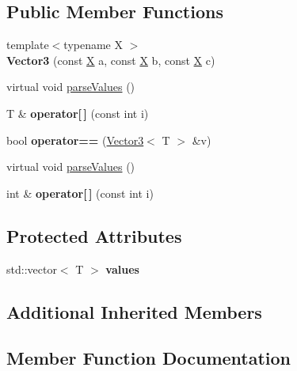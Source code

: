 \subsection*{Public Member Functions}
\begin{DoxyCompactItemize}
\item 
\mbox{\label{classVector3_a4f08341de72b29b98df76f81eaf6d4f0}} 
{\footnotesize template$<$typename X $>$ }\\{\bfseries Vector3} (const \hyperlink{classX}{X} a, const \hyperlink{classX}{X} b, const \hyperlink{classX}{X} c)
\item 
virtual void \hyperlink{classVector3_a15a1271a3ba4497ca95cc4dd66481f9e}{parse\+Values} ()
\item 
\mbox{\label{classVector3_a9833b43da58a55b3d466c576be10bad5}} 
T \& {\bfseries operator\mbox{[}$\,$\mbox{]}} (const int i)
\item 
\mbox{\label{classVector3_a2a17ca1fc283c97c240b5fabcf1de375}} 
bool {\bfseries operator==} (\hyperlink{classVector3}{Vector3}$<$ T $>$ \&v)
\item 
virtual void \hyperlink{classVector3_a15a1271a3ba4497ca95cc4dd66481f9e}{parse\+Values} ()
\item 
\mbox{\label{classVector3_a6fd34fef8f2a085889138fbb9e437f4d}} 
int \& {\bfseries operator\mbox{[}$\,$\mbox{]}} (const int i)
\end{DoxyCompactItemize}
\subsection*{Protected Attributes}
\begin{DoxyCompactItemize}
\item 
\mbox{\label{classVector3_a9ca9d69851a096e97b03ee62a7fbbb99}} 
std\+::vector$<$ T $>$ {\bfseries values}
\end{DoxyCompactItemize}
\subsection*{Additional Inherited Members}


\subsection{Member Function Documentation}
\mbox{\label{classVector3_a15a1271a3ba4497ca95cc4dd66481f9e}} 
